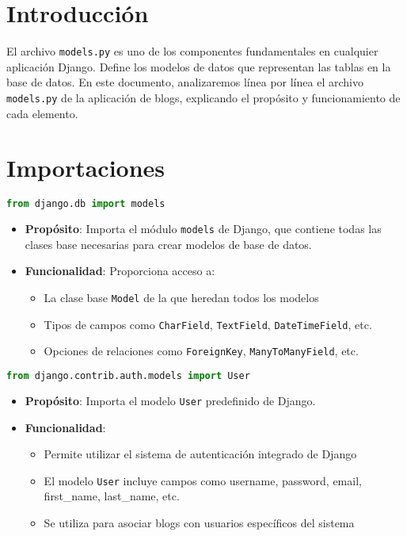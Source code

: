 \documentclass[11pt,a4paper]{report}
\begin{document}
	\section{Introducción}
	
	El archivo \texttt{models.py} es uno de los componentes fundamentales en cualquier aplicación Django. Define los modelos de datos que representan las tablas en la base de datos. En este documento, analizaremos línea por línea el archivo \texttt{models.py} de la aplicación de blogs, explicando el propósito y funcionamiento de cada elemento.
	
	\section{Importaciones}
	
	\begin{lstlisting}[language=Python]
		from django.db import models
	\end{lstlisting}
	
	\begin{itemize}
		\item \textbf{Propósito}: Importa el módulo \texttt{models} de Django, que contiene todas las clases base necesarias para crear modelos de base de datos.
		\item \textbf{Funcionalidad}: Proporciona acceso a:
		\begin{itemize}
			\item La clase base \texttt{Model} de la que heredan todos los modelos
			\item Tipos de campos como \texttt{CharField}, \texttt{TextField}, \texttt{DateTimeField}, etc.
			\item Opciones de relaciones como \texttt{ForeignKey}, \texttt{ManyToManyField}, etc.
		\end{itemize}
	\end{itemize}
	
	\begin{lstlisting}[language=Python]
		from django.contrib.auth.models import User
	\end{lstlisting}
	\begin{itemize}
		\item \textbf{Propósito}: Importa el modelo \texttt{User} predefinido de Django.
		\item \textbf{Funcionalidad}: 
		\begin{itemize}
			\item Permite utilizar el sistema de autenticación integrado de Django
			\item El modelo \texttt{User} incluye campos como username, password, email, first\_name, last\_name, etc.
			\item Se utiliza para asociar blogs con usuarios específicos del sistema
		\end{itemize}
	\end{itemize}
	
\end{document}
